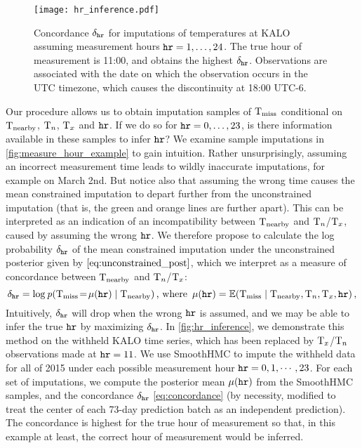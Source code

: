 \begin{figure}[tbp]
\centering
\texttt{[image: hr\_inference.pdf]}
\caption{
    \label{fig:hr_inference}
    Concordance \(\concordance_\hour\) for imputations of temperatures at KALO assuming measurement hours \(\hour=1,\dotsc,24\). 
    The true hour of measurement is 11:00, and obtains the highest \(\delta_\hour\).
    Observations are associated with the date on which the observation occurs in the UTC timezone, which causes the discontinuity at 18:00 UTC-6.
    }
\end{figure}

Our procedure allows us to obtain imputation samples of \(\Temp_\miss\) conditional on \(\Temp_\obs\), \(\Tn\), \(\Tx\) and \(\hour\).
If we do so for \(\hour=0,\dotsc,23\), is there information available in these samples to infer \(\hour\)?
We examine sample imputations in \autoref{fig:measure_hour_example} to gain intuition.
Rather unsurprisingly, assuming an incorrect measurement time leads to wildly inaccurate imputations, for example on March 2nd.
But notice also that assuming the wrong time causes the mean constrained imputation to depart further from the unconstrained imputation
(that is, the green and orange lines are further apart).
This can be interpreted as an indication of an incompatibility between \(\Temp_\obs\) and \(\Tn\)/\(\Tx\), caused by assuming the wrong \(\hour\).
We therefore propose to calculate the log probability \(\concordance_\hour\) of the mean constrained imputation under the unconstrained posterior given by \(\autoref{eq:unconstrained_post}\), which we interpret as a measure of concordance between \(\Temp_\obs\) and \(\Tn\)/\(\Tx\):
\begin{equation}
    \concordance_\hour = \log \prob\del{ \Temp_\miss \! = \! \mu\del{\hour} \mid \Temp_\obs }
    \,\text{, where}\ \,
    \mu\del{\hour} = \E\del{ \Temp_\miss \mid \Temp_\obs, \Tn, \Tx, \hour }\,,
\label{eq:concordance}
\end{equation}
Intuitively, \(\concordance_\hour\) will drop when the wrong \(\hour\) is assumed,
and we may be able to infer the true \(\hour\) by maximizing \(\concordance_\hour\).
In \autoref{fig:hr_inference}, we demonstrate this method on the withheld KALO time series, which
has been replaced by \(\Tx\)/\(\Tn\) observations made at \(\hour=11\).
We use SmoothHMC to impute the withheld data for all of 2015 under each possible measurement hour \(\hour=0,1,\cdots,23\).
For each set of imputations, we compute the posterior mean \(\mu\del{\hour}\) from the SmoothHMC samples, 
and the concordance \(\concordance_\hour\) \autoref{eq:concordance} (by necessity, modified to treat the center of each 73-day prediction batch as an independent prediction).
The concordance is highest for the true hour of measurement so that, in this example at least, the correct hour of measurement would be inferred.

